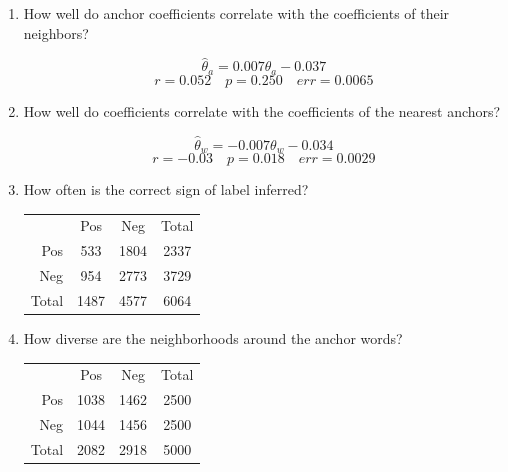 \documentclass[11pt]{article} %
\begin{document}
\begin{enumerate}
\item How well do anchor coefficients correlate with the coefficients of their neighbors?

\[ \hat{\theta}_a = 0.007 \theta_a - 0.037 \]
\[ r = 0.052 \quad p = 0.250 \quad err = 0.0065 \]


\item How well do coefficients correlate with the coefficients of the nearest anchors?

\[ \hat{\theta}_w = -0.007 \theta_w - 0.034 \]
\[ r = -0.03 \quad p = 0.018 \quad err = 0.0029 \]


\item How often is the correct sign of label inferred?

\begin{center}
\begin{tabular}{r|c|c|c}
& Pos & Neg & Total \\
Pos & 533 & 1804 & 2337 \\
Neg & 954 & 2773 & 3729 \\
Total & 1487 & 4577 & 6064 
\end{tabular}
\end{center}

\item How diverse are the neighborhoods around the anchor words?
\begin{center}
\begin{tabular}{r|c|c|c}
& Pos & Neg & Total \\
Pos & 1038 & 1462 & 2500 \\
Neg & 1044 & 1456 & 2500 \\
Total & 2082 & 2918 & 5000 
\end{tabular}
\end{center}

\end{enumerate}
\end{document}

